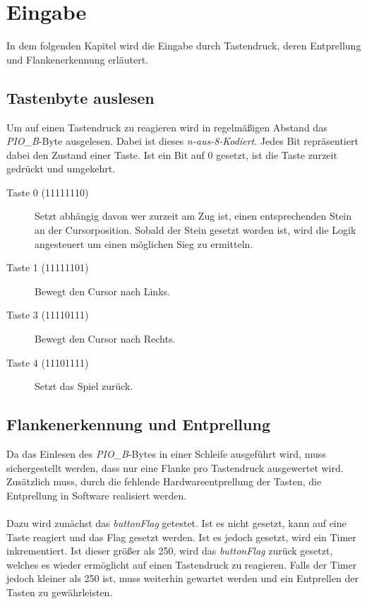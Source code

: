 \newpage
\section{Eingabe}\label{cha:input}
    In dem folgenden Kapitel wird die Eingabe durch Tastendruck, deren Entprellung und Flankenerkennung erläutert.
    
    \subsection{Tastenbyte auslesen}
        Um auf einen Tastendruck zu reagieren wird in regelmäßigen Abstand das \textit{PIO\_B}-Byte ausgelesen.
        Dabei ist dieses \textit{n-aus-8-Kodiert}. Jedes Bit repräsentiert dabei den Zustand einer Taste.
        Ist ein Bit auf 0 gesetzt, ist die Taste zurzeit gedrückt und umgekehrt.

        \begin{description}
            \item [Taste 0 (11111110)]
            Setzt abhängig davon wer zurzeit am Zug ist, einen entsprechenden Stein an der Cursorposition.
            Sobald der Stein gesetzt worden ist, wird die Logik angesteuert um einen möglichen Sieg zu ermitteln.
            \item [Taste 1 (11111101)] Bewegt den Cursor nach Links.
            \item [Taste 3 (11110111)] Bewegt den Cursor nach Rechts.
            \item [Taste 4 (11101111)] Setzt das Spiel zurück.
        \end{description}


    \subsection{Flankenerkennung und Entprellung}
        Da das Einlesen des \textit{PIO\_B}-Bytes in einer Schleife ausgeführt wird,
        muss sichergestellt werden, dass nur eine Flanke pro Tastendruck ausgewertet wird.
        Zusätzlich muss, durch die fehlende Hardwareentprellung der Tasten, die Entprellung in Software realisiert werden.
        \\
        \\
        Dazu wird zunächst das \textit{buttonFlag} getestet. Ist es nicht gesetzt, kann auf eine Taste reagiert und
        das Flag gesetzt werden. Ist es jedoch gesetzt, wird ein Timer inkrementiert.
        Ist dieser größer als 250, wird das \textit{buttonFlag} zurück gesetzt,
        welches es wieder ermöglicht auf einen Tastendruck zu reagieren.
        Falls der Timer jedoch kleiner als 250 ist, muss weiterhin gewartet werden und ein Entprellen der Tasten
        zu gewährleisten.

